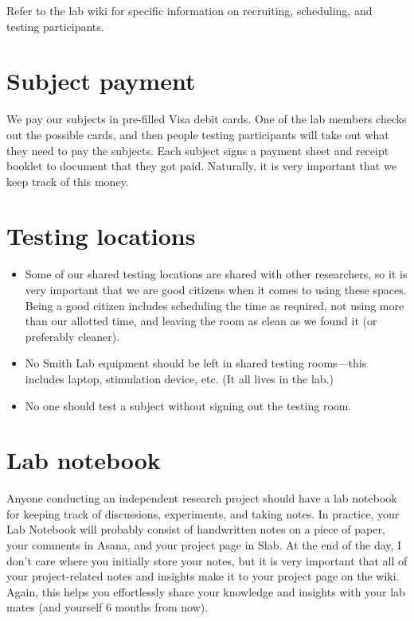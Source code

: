 \documentclass[letterpaper,11pt,oneside]{memoir}
\begin{document}
Refer to the lab wiki for specific information on recruiting, scheduling, and testing participants.


\section{Subject payment}
\label{sec:subject_payment}

We pay our subjects in pre-filled Visa debit cards. One of the lab members checks out the possible cards, and then people testing participants will take out what they need to pay the subjects. Each subject signs a payment sheet and receipt booklet to document that they got paid. Naturally, it is very important that we keep track of this money.



\section{Testing locations}
\label{sec:testing_locations}

\begin{itemize}
\item Some of our shared testing locations are shared with other researchers, so it is very important that we are good citizens when it comes to using these spaces. Being a good citizen includes scheduling the time as required, not using more than our allotted time, and leaving the room as clean as we found it (or preferably cleaner).
\item No Smith Lab equipment should be left in shared testing rooms---this includes laptop, stimulation device, etc. (It all lives in the lab.)
\item No one should test a subject without signing out the testing room.
\end{itemize}



\section{Lab notebook}
\label{sec:lab_notebook}

Anyone conducting an independent research project should have a lab notebook for keeping track of discussions, experiments, and taking notes. In practice, your Lab Notebook will probably consist of handwritten notes on a piece of paper, your comments in Asana, and your project page in Slab. At the end of the day, I don't care where you initially store your notes, but it is very important that all of your project-related notes and insights make it to your project page on the wiki. Again, this helps you effortlessly share your knowledge and insights with your lab mates (and yourself 6 months from now). 
\end{document}
